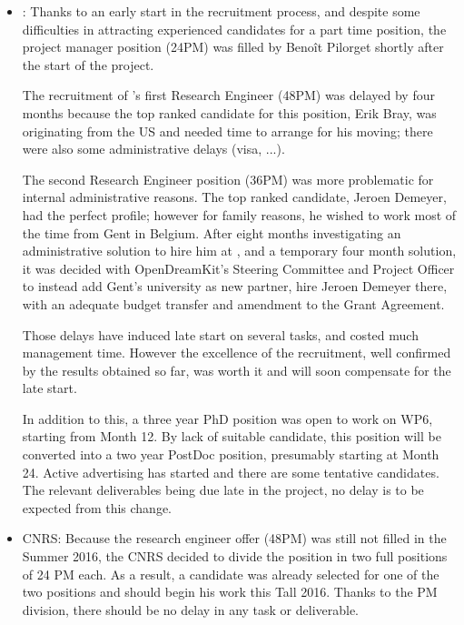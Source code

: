 \documentclass{deliverablereport}
\begin{document}
\begin{itemize}
\item{:}
  Thanks to an early start in the recruitment process, and despite
  some difficulties in attracting experienced candidates for a part
  time position, the project manager position (24PM) was filled by
  Benoît Pilorget shortly after the start of the project.

  The recruitment of 's first Research Engineer (48PM) was
  delayed by four months because the top ranked candidate for this
  position, Erik Bray, was originating from the US and needed time to
  arrange for his moving; there were also some administrative delays
  (visa, ...).

  The second Research Engineer position (36PM) was more problematic
  for internal administrative reasons. The top ranked candidate,
  Jeroen Demeyer, had the perfect profile; however for family reasons,
  he wished to work most of the time from Gent in Belgium. After eight
  months investigating an administrative solution to hire him at
  , and a temporary four month solution, it was decided with
  OpenDreamKit's Steering Committee and Project Officer to instead add
  Gent's university as new partner, hire Jeroen Demeyer there, with an
  adequate budget transfer and amendment to the Grant Agreement.

  Those delays have induced late start on several tasks, and costed
  much management time. However the excellence of the recruitment, well
  confirmed by the results obtained so far, was worth it and will soon
  compensate for the late start.

  In addition to this, a three year PhD position was open to work on WP6, starting from
  Month 12. By lack of suitable candidate, this position will be
  converted into a two year PostDoc position, presumably starting at
  Month 24. Active advertising has started and there are some
  tentative candidates. The relevant deliverables being due late in
  the project, no delay is to be expected from this change.\\

\item{CNRS:} Because the research engineer offer (48PM) was still not filled
  in the Summer 2016, the CNRS decided to divide the position in two full
  positions of 24 PM each. As a result, a candidate was already selected for
  one of the two positions and should begin his work this Tall 2016.
  Thanks to the PM division, there should be no delay in any task or
  deliverable. \\


\end{itemize}
\end{document}
